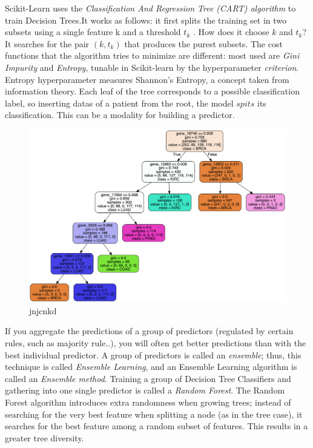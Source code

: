 \documentclass{article}
\begin{document}
Scikit-Learn uses the \textit{Classification And Regression Tree (CART) algorithm} to train Decision Trees.It works as follows: it first splits the training set in two subsets using a single feature k and a threshold $t_k$ . How does it choose $k$ and $t_k$? It searches for the pair $(k, t_k)$ that produces the purest subsets. The cost functions that the algorithm tries to minimize are different: most used are \textit{Gini Impurity} and \textit{Entropy}, tunable in Scikit-learn by the hyperparameter \textit{criterion}. Entropy hyperparameter measures Shannon's Entropy, a concept taken from information theory.
Each leaf of the tree corresponds to a possible classification label, so inserting datas of a patient from the root, the model $spits$ its classification. This can be a modality for building a predictor.

\begin{figure}
\centering
\includegraphics[width=\linewidth]{img/tree_best.png}
\caption{jnjcnkd}
\label{fig1}
\end{figure}

If you aggregate the predictions of a group of predictors (regulated by certain rules, such as majority rule..), you will often get better predictions than with the best individual predictor. A group of predictors is called an \textit{ensemble}; thus, this technique is called \textit{Ensemble Learning}, and an Ensemble Learning algorithm is called an \textit{Ensemble method}.
Training a group of Decision Tree Classifiers and gathering into one single predictor is called a \textit{Random Forest}.
The Random Forest algorithm introduces extra randomness when growing trees; instead of searching for the very best feature when splitting a node (as in the tree case), it searches for the best feature among a random subset of features. This results in a greater tree diversity.
\end{document}
